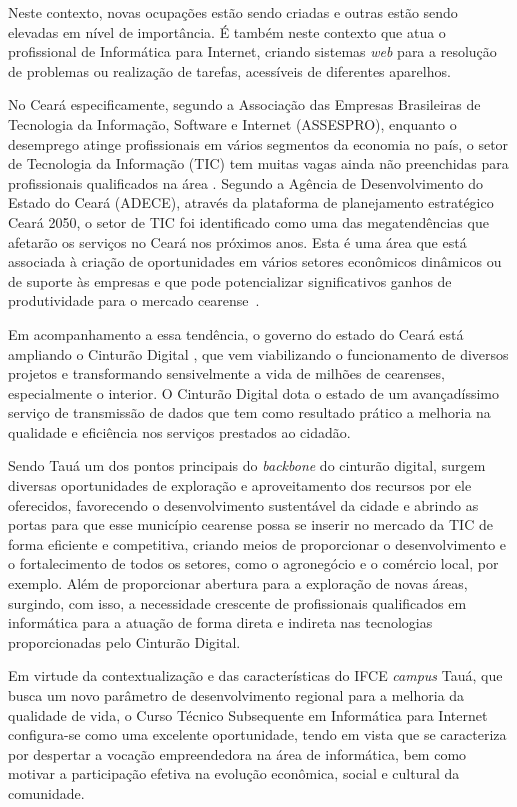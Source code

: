 Neste contexto, novas ocupações estão sendo criadas e outras estão sendo
elevadas em nível de importância. É também neste contexto que atua o
profissional de Informática para Internet, criando sistemas \emph{web} para a
resolução de problemas ou realização de tarefas, acessíveis de diferentes aparelhos.

No Ceará especificamente, segundo a Associação das Empresas Brasileiras de
Tecnologia da Informação, Software e Internet (ASSESPRO), enquanto o desemprego
atinge profissionais em vários segmentos da economia no país, o setor de
Tecnologia da Informação (TIC)  tem muitas vagas ainda não preenchidas para
profissionais qualificados na área \cite{estadao2019}. Segundo a Agência de
Desenvolvimento do Estado do Ceará (ADECE), através da plataforma de
planejamento estratégico Ceará 2050, o setor de TIC foi identificado como uma
das megatendências que afetarão os serviços no Ceará nos próximos anos. Esta é
uma área que está associada à criação de oportunidades em vários setores
econômicos dinâmicos ou de suporte às empresas e que pode potencializar
significativos ganhos de produtividade para o mercado cearense~\cite{adece2019}.

Em acompanhamento a essa tendência, o governo do estado do Ceará está ampliando
o Cinturão Digital \cite{diario2018cinturao}, que vem viabilizando o
funcionamento de diversos projetos e transformando sensivelmente a vida de
milhões de cearenses, especialmente o interior. O Cinturão Digital dota o estado
de um avançadíssimo serviço de transmissão de dados que tem como resultado
prático a melhoria na qualidade e eficiência nos serviços prestados ao cidadão.


Sendo Tauá um dos pontos principais do \emph{backbone} do cinturão digital,
surgem diversas oportunidades de exploração e aproveitamento dos recursos por
ele oferecidos, favorecendo o desenvolvimento sustentável da cidade e abrindo as
portas para que esse município cearense possa se inserir no mercado da TIC de
forma eficiente e competitiva, criando meios de proporcionar o desenvolvimento e
o fortalecimento   de todos os setores, como o agronegócio e o comércio local,
por exemplo. Além de proporcionar abertura para a exploração de novas áreas,
surgindo, com isso,  a necessidade crescente de profissionais qualificados em
informática para a atuação de forma direta e indireta nas tecnologias
proporcionadas pelo Cinturão Digital.



Em virtude da contextualização e das características do IFCE  \textit{campus}
Tauá, que busca um novo parâmetro de desenvolvimento regional para a melhoria da
qualidade de vida, o Curso Técnico Subsequente em Informática para Internet 
configura-se como uma excelente oportunidade, tendo em vista que se caracteriza
por despertar a vocação empreendedora na área de informática, bem como motivar a
participação efetiva na evolução econômica, social e cultural da comunidade.

